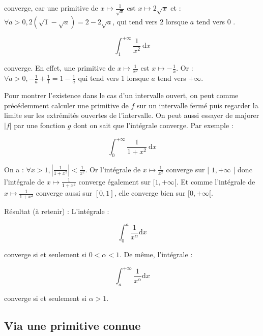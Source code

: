 converge, car une primitive de $x \mapsto \frac{1}{\sqrt{x}}$ est $x \mapsto 2 \sqrt{x}$ et : $\forall a>0,2(\sqrt{1}-\sqrt{a})=2-2 \sqrt{a}$, qui tend vers 2 lorsque $a$ tend vers 0 .

$$
\int_1^{+\infty} \frac{1}{x^2} \mathrm{~d} x
$$

converge. En effet, une primitive de $x \mapsto \frac{1}{x^2}$ est $x \mapsto-\frac{1}{x}$. Or : $\forall a>0,-\frac{1}{a}+\frac{1}{1}=1-\frac{1}{a}$ qui tend vers 1 lorsque $a$ tend vers $+\infty$.

Pour montrer l'existence dans le cas d'un intervalle ouvert, on peut comme précédemment calculer une primitive de $f$ sur un intervalle fermé puis regarder la limite sur les extrémités ouvertes de l'intervalle. On peut aussi essayer de majorer $|f|$ par une fonction $g$ dont on sait que l'intégrale converge. Par exemple :

$$
\int_0^{+\infty} \frac{1}{1+x^2} \mathrm{~d} x
$$


On a : $\forall x>1,\left|\frac{1}{1+x^2}\right|<\frac{1}{x^2}$. Or l'intégrale de $x \mapsto \frac{1}{x^2}$ converge sur [ $1,+\infty$ [ donc l'intégrale de $x \mapsto \frac{1}{1+x^2}$ converge également sur $[1,+\infty[$. Et comme l'intégrale de $x \mapsto \frac{1}{1+x^2}$ converge aussi sur $[0,1]$, elle converge bien sur $[0,+\infty[$.

Résultat (à retenir) : L'intégrale :

$$
\int_0^a \frac{1}{x^\alpha} \mathrm{d} x
$$

converge si et seulement si $0<\alpha<1$.
De même, l'intégrale :

$$
\int_a^{+\infty} \frac{1}{x^\alpha} \mathrm{d} x
$$

converge si et seulement si $\alpha>1$.

\subsection{Via une primitive connue}

